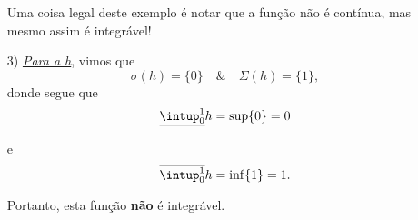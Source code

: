 \documentclass[../analysisII_notes.tex]{subfiles}
\begin{document}
\begin{example}
\begin{itemize}
		      Uma coisa legal deste exemplo é notar que a função não é contínua, mas mesmo assim é integrável!
		\item[3)] \hyperlink{dirichlet}{\textit{Para a h}}, vimos que
		      \[
			      \sigma (h) = \{0\} \quad\&\quad \Sigma (h) = \{1\},
		      \]
		      donde segue que
		      \[
			      \underline{\intup_{0}^{1}}h = \sup_{}\{0\} = 0
		      \]
		      e
		      \[
			      \overline{\intup_{0}^{1}}h = \inf_{}\{1\} = 1.
		      \]
		      Portanto, esta função \textbf{não} é integrável.
	\end{itemize}
\end{example}
\end{document}
